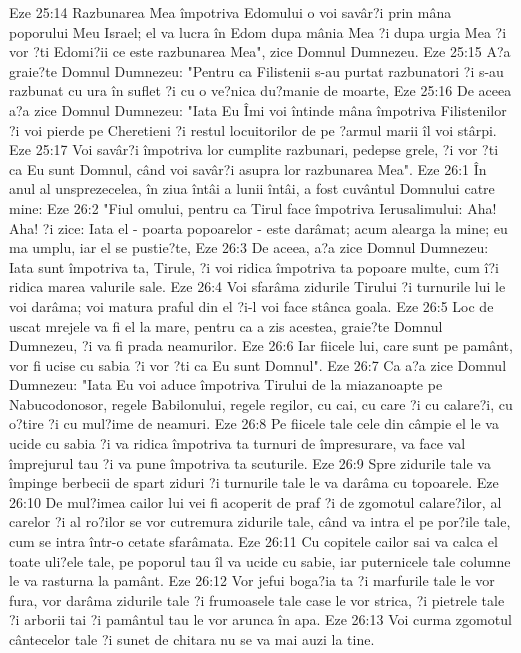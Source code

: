 Eze 25:14  Razbunarea Mea împotriva Edomului o voi savâr?i prin mâna poporului Meu Israel; el va lucra în Edom dupa mânia Mea ?i dupa urgia Mea ?i vor ?ti Edomi?ii ce este razbunarea Mea", zice Domnul Dumnezeu.
Eze 25:15  A?a graie?te Domnul Dumnezeu: "Pentru ca Filistenii s-au purtat razbunatori ?i s-au razbunat cu ura în suflet ?i cu o ve?nica du?manie de moarte,
Eze 25:16  De aceea a?a zice Domnul Dumnezeu: "Iata Eu Îmi voi întinde mâna împotriva Filistenilor ?i voi pierde pe Cheretieni ?i restul locuitorilor de pe ?armul marii îl voi stârpi.
Eze 25:17  Voi savâr?i împotriva lor cumplite razbunari, pedepse grele, ?i vor ?ti ca Eu sunt Domnul, când voi savâr?i asupra lor razbunarea Mea".
Eze 26:1  În anul al unsprezecelea, în ziua întâi a lunii întâi, a fost cuvântul Domnului catre mine:
Eze 26:2  "Fiul omului, pentru ca Tirul face împotriva Ierusalimului: Aha! Aha! ?i zice: Iata el - poarta popoarelor - este darâmat; acum alearga la mine; eu ma umplu, iar el se pustie?te,
Eze 26:3  De aceea, a?a zice Domnul Dumnezeu: Iata sunt împotriva ta, Tirule, ?i voi ridica împotriva ta popoare multe, cum î?i ridica marea valurile sale.
Eze 26:4  Voi sfarâma zidurile Tirului ?i turnurile lui le voi darâma; voi matura praful din el ?i-l voi face stânca goala.
Eze 26:5  Loc de uscat mrejele va fi el la mare, pentru ca a zis acestea, graie?te Domnul Dumnezeu, ?i va fi prada neamurilor.
Eze 26:6  Iar fiicele lui, care sunt pe pamânt, vor fi ucise cu sabia ?i vor ?ti ca Eu sunt Domnul".
Eze 26:7  Ca a?a zice Domnul Dumnezeu: "Iata Eu voi aduce împotriva Tirului de la miazanoapte pe Nabucodonosor, regele Babilonului, regele regilor, cu cai, cu care ?i cu calare?i, cu o?tire ?i cu mul?ime de neamuri.
Eze 26:8  Pe fiicele tale cele din câmpie el le va ucide cu sabia ?i va ridica împotriva ta turnuri de împresurare, va face val împrejurul tau ?i va pune împotriva ta scuturile.
Eze 26:9  Spre zidurile tale va împinge berbecii de spart ziduri ?i turnurile tale le va darâma cu topoarele.
Eze 26:10  De mul?imea cailor lui vei fi acoperit de praf ?i de zgomotul calare?ilor, al carelor ?i al ro?ilor se vor cutremura zidurile tale, când va intra el pe por?ile tale, cum se intra într-o cetate sfarâmata.
Eze 26:11  Cu copitele cailor sai va calca el toate uli?ele tale, pe poporul tau îl va ucide cu sabie, iar puternicele tale columne le va rasturna la pamânt.
Eze 26:12  Vor jefui boga?ia ta ?i marfurile tale le vor fura, vor darâma zidurile tale ?i frumoasele tale case le vor strica, ?i pietrele tale ?i arborii tai ?i pamântul tau le vor arunca în apa.
Eze 26:13  Voi curma zgomotul cântecelor tale ?i sunet de chitara nu se va mai auzi la tine.
